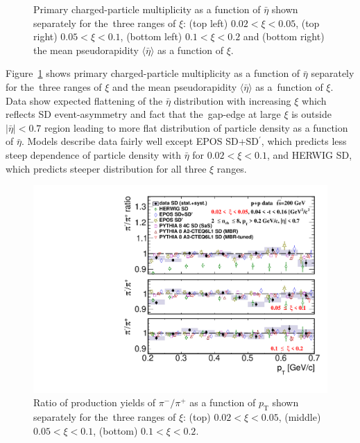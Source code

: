 \begin{figure}[t!]
	\caption{Primary charged-particle multiplicity as a function of $\bar{\eta}$ shown  separately for the~three ranges of  $\xi$: (top left) $0.02<\xi<0.05$, (top right) $0.05<\xi<0.1$, (bottom left) $0.1<\xi<0.2$ and (bottom right) the mean pseudorapidity  $\langle\bar{\eta}\rangle$ as a function of $\xi$.}
	\label{fig:results_star_eta}
\end{figure}

Figure~\ref{fig:results_star_eta} shows primary charged-particle multiplicity as a function of $\bar{\eta}$ 
separately for the~three ranges of $\xi$ and the mean pseudorapidity $\langle \bar{\eta} \rangle$ as a~function of $\xi$. Data show expected flattening of the $\bar{\eta}$ distribution with increasing $\xi$ which reflects SD event-asymmetry and fact that the~gap-edge at large $\xi$ is outside $|\bar{\eta}|<0.7$ region leading to more flat distribution of particle density as a function of $\bar{\eta}$. %
Models describe data fairly well except EPOS SD+SD$^\prime$, which predicts less steep dependence of particle density with $\bar{\eta}$  for $0.02<\xi<0.1$, and HERWIG SD, which predicts steeper  distribution  for all three $\xi$ ranges.



\begin{figure}[b!]
	\centering
	\includegraphics[width=.99\textwidth,page=1]{chapters/chrgSTAR/img/results/particleRatio_prt_0.pdf}
	\caption{Ratio of production yields of $\pi^-/\pi^+$ as a function of $p_\textrm{T}$ shown separately for the~three ranges of $\xi$: (top) $0.02<\xi<0.05$, (middle) $0.05<\xi<0.1$, (bottom) $0.1<\xi<0.2$.}
	\label{fig:results_star_pion}
	
\end{figure}

